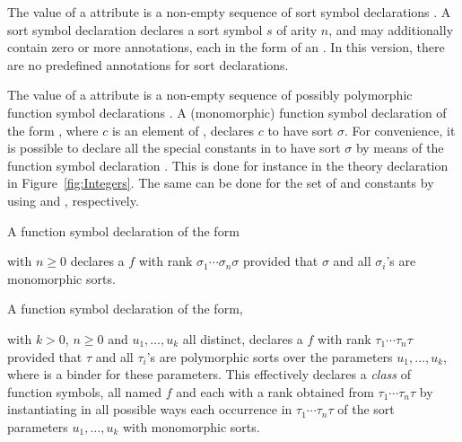 The value of a  attribute is a non-empty sequence
of sort symbol declarations .
A sort symbol declaration  declares 
a sort symbol $s$ of arity $n$, and 
may additionally contain zero or more annotations,
each in the form of an .
In this version, there are no predefined annotations for sort declarations.

The value of a  attribute is a non-empty sequence
of possibly polymorphic function symbol declarations .
A (monomorphic) function symbol declaration 
of the form ,
where $c$ is an element of ,
declares $c$ to have sort $\sigma$.
For convenience,
it is possible to declare all the special constants in  
to have sort $\sigma$ by means of the function symbol declaration
.
This is done for instance in the theory declaration in Figure~\ref{fig:Integers}.
The same can be done for the set of  and  constants
by using  and , respectively. 
 
A function symbol declaration of the form
\begin{center}
\end{center}
with $n \geq 0$ declares a  $f$ with rank 
$\sigma_1\cdots\sigma_n\sigma$
provided that $\sigma$ and all $\sigma_i$'s are monomorphic sorts.

A function symbol declaration of the form,
\begin{center}
\end{center}
with $k > 0$, $n \geq 0$ and $u_1, \ldots, u_k$ all distinct,
declares a  $f$ with rank $\tau_1\cdots\tau_n\tau$
provided that $\tau$ and all $\tau_i$'s are polymorphic sorts over 
the parameters $u_1, \ldots, u_k$, where  is a binder for
these parameters.
This effectively declares a \emph{class} of function symbols, 
all named $f$ and each with a rank obtained from $\tau_1\cdots\tau_n\tau$ 
by instantiating in all possible ways each occurrence in $\tau_1\cdots\tau_n\tau$
of the sort parameters $u_1,\ldots,u_k$ with monomorphic sorts.

